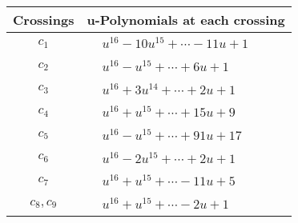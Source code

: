 \documentclass[1p]{elsarticle_modified}
\theoremstyle{definition}
\begin{document}
\begin{tabular}{m{50pt}|m{274pt}}
Crossings & \hspace{64pt}u-Polynomials at each crossing \\
\hline $$\begin{aligned}c_{1}\end{aligned}$$&$\begin{aligned}
&u^{16}-10 u^{15}+\cdots-11 u+1
\end{aligned}$\\
\hline $$\begin{aligned}c_{2}\end{aligned}$$&$\begin{aligned}
&u^{16}- u^{15}+\cdots+6 u+1
\end{aligned}$\\
\hline $$\begin{aligned}c_{3}\end{aligned}$$&$\begin{aligned}
&u^{16}+3 u^{14}+\cdots+2 u+1
\end{aligned}$\\
\hline $$\begin{aligned}c_{4}\end{aligned}$$&$\begin{aligned}
&u^{16}+u^{15}+\cdots+15 u+9
\end{aligned}$\\
\hline $$\begin{aligned}c_{5}\end{aligned}$$&$\begin{aligned}
&u^{16}- u^{15}+\cdots+91 u+17
\end{aligned}$\\
\hline $$\begin{aligned}c_{6}\end{aligned}$$&$\begin{aligned}
&u^{16}-2 u^{15}+\cdots+2 u+1
\end{aligned}$\\
\hline $$\begin{aligned}c_{7}\end{aligned}$$&$\begin{aligned}
&u^{16}+u^{15}+\cdots-11 u+5
\end{aligned}$\\
\hline $$\begin{aligned}c_{8},c_{9}\end{aligned}$$&$\begin{aligned}
&u^{16}+u^{15}+\cdots-2 u+1
\end{aligned}$\\

\end{tabular}
\end{document}
